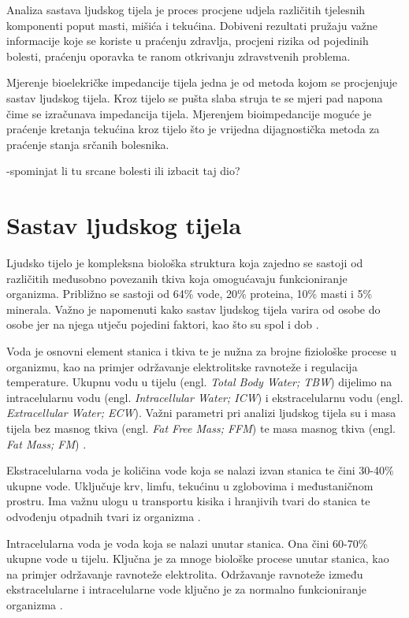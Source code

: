\documentclass[../diplomski_rad.tex]{subfiles}
\begin{document}
\sloppy

\justifying

Analiza sastava ljudskog tijela je proces procjene udjela različitih tjelesnih komponenti 
poput masti, mišića i tekućina.
Dobiveni rezultati pružaju važne informacije koje se koriste u praćenju zdravlja, 
procjeni rizika od pojedinih bolesti, praćenju oporavka te ranom otkrivanju zdravstvenih problema.

Mjerenje bioelekričke impedancije tijela jedna je od metoda kojom se procjenjuje sastav ljudskog tijela. 
Kroz tijelo se pušta slaba struja te se mjeri pad napona čime se izračunava impedancija tijela. 
Mjerenjem bioimpedancije moguće je praćenje kretanja tekućina kroz tijelo što je vrijedna dijagnostička metoda za praćenje stanja srčanih bolesnika. 

-spominjat li tu srcane bolesti ili izbacit taj dio?

\section{Sastav ljudskog tijela}

Ljudsko tijelo je kompleksna biološka struktura koja zajedno se sastoji od različitih međusobno povezanih tkiva koja 
omogućavaju funkcioniranje organizma. Približno se sastoji od 
64\% vode,
20\% proteina,
10\% masti 
i 5\% minerala.
Važno je napomenuti kako sastav ljudskog tijela varira od osobe do osobe jer na njega utječu 
pojedini faktori, kao što su spol i dob \cite{Bera2014}.  

Voda je osnovni element stanica i tkiva te je nužna za brojne fiziološke procese u organizmu, 
kao na primjer održavanje elektrolitske ravnoteže i regulacija temperature.
Ukupnu vodu u tijelu (engl. \textit{Total Body Water; TBW}) 
dijelimo na intracelularnu vodu (engl. \textit{Intracellular Water; ICW}) i ekstracelularnu vodu (engl. \textit{Extracellular Water; ECW}). 
Važni parametri pri analizi ljudskog tijela su i masa tijela bez masnog tkiva (engl. \textit{Fat Free Mass; FFM}) 
te masa masnog tkiva (engl. \textit{Fat Mass; FM}) \cite{Bera2014}.

Ekstracelularna voda je količina vode koja se nalazi izvan stanica te čini 30-40\% ukupne vode. Uključuje krv, limfu, tekućinu u 
zglobovima i međustaničnom prostru. Ima važnu ulogu u transportu kisika i hranjivih tvari do stanica te odvođenju otpadnih 
tvari iz organizma \cite{Bera2014}.

Intracelularna voda je voda koja se nalazi unutar stanica. Ona čini 60-70\% ukupne vode u tijelu. 
Ključna je za mnoge biološke procese unutar stanica, kao na primjer održavanje ravnoteže elektrolita. 
Održavanje ravnoteže između ekstracelularne i intracelularne vode ključno je za normalno funkcioniranje organizma \cite{Bera2014}.
\end{document}
